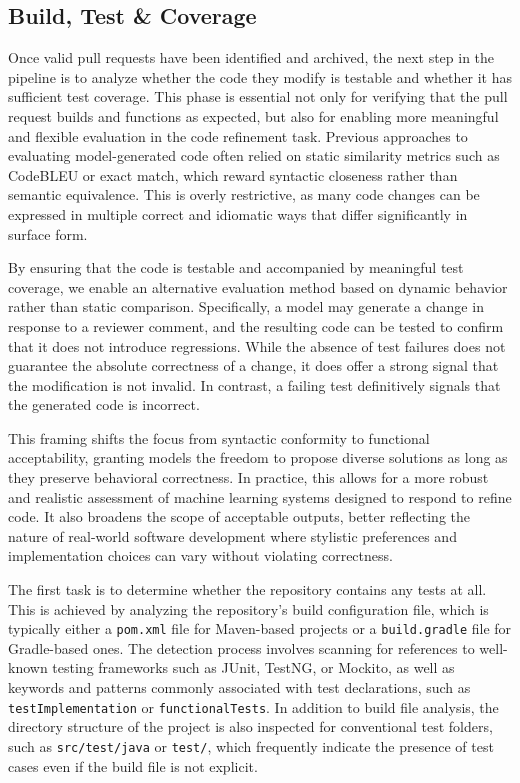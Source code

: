 \subsection{Build, Test \& Coverage}

Once valid pull requests have been identified and archived, the next step in the pipeline is to
analyze whether the code they modify is testable and whether it has sufficient test coverage. This
phase is essential not only for verifying that the pull request builds and functions as expected,
but also for enabling more meaningful and flexible evaluation in the code refinement task. Previous
approaches to evaluating model-generated code often relied on static similarity metrics such as
CodeBLEU or exact match, which reward syntactic closeness rather than semantic equivalence. This is
overly restrictive, as many code changes can be expressed in multiple correct and idiomatic ways
that differ significantly in surface form.

By ensuring that the code is testable and accompanied by meaningful test coverage, we enable an
alternative evaluation method based on dynamic behavior rather than static comparison. Specifically,
a model may generate a change in response to a reviewer comment, and the resulting code can be
tested to confirm that it does not introduce regressions. While the absence of test failures does
not guarantee the absolute correctness of a change, it does offer a strong signal that the
modification is not invalid. In contrast, a failing test definitively signals that the generated
code is incorrect.

This framing shifts the focus from syntactic conformity to functional acceptability, granting models
the freedom to propose diverse solutions as long as they preserve behavioral correctness. In
practice, this allows for a more robust and realistic assessment of machine learning systems
designed to respond to refine code. It also broadens the scope of acceptable outputs, better
reflecting the nature of real-world software development where stylistic preferences and
implementation choices can vary without violating correctness.

The first task is to determine whether the repository contains any tests at all. This is achieved by
analyzing the repository’s build configuration file, which is typically either a \texttt{pom.xml}
file for Maven-based projects or a \texttt{build.gradle} file for Gradle-based ones. The detection
process involves scanning for references to well-known testing frameworks such as JUnit, TestNG, or
Mockito, as well as keywords and patterns commonly associated with test declarations, such as
\texttt{testImplementation} or \texttt{functionalTests}. In addition to build file analysis, the
directory structure of the project is also inspected for conventional test folders, such as
\texttt{src/test/java} or \texttt{test/}, which frequently indicate the presence of test cases even
if the build file is not explicit.


